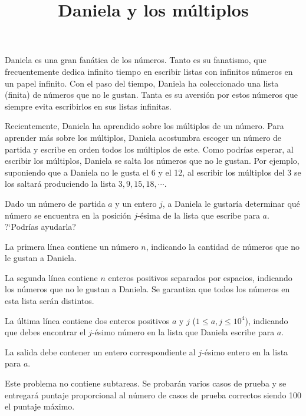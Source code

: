 \documentclass{oci}
\title{Daniela y los múltiplos}
\begin{document}
\begin{problemDescription}
Daniela es una gran fanática de los números.
Tanto es su fanatismo, que frecuentemente dedica infinito tiempo en
escribir listas con infinitos números en un papel infinito.
Con el paso del tiempo, Daniela ha coleccionado una lista (finita) de números que no
le gustan.
Tanta es su aversión por estos números que siempre evita escribirlos en sus
listas infinitas.

Recientemente, Daniela ha aprendido sobre los múltiplos de un número.
Para aprender más sobre los múltiplos, Daniela acostumbra escoger un número de partida y
escribe en orden todos los múltiplos de este.
Como podrías esperar, al escribir los múltiplos, Daniela se salta los números que no le gustan.
Por ejemplo, suponiendo que a Daniela no le gusta el 6 y el 12, al escribir los múltiplos
del 3 se los saltará produciendo la lista $3, 9, 15, 18, \cdots$.

Dado un número de partida $a$ y un entero $j$, a Daniela le gustaría determinar
qué número se encuentra en la posición $j$-ésima de la lista que escribe para $a$.
?`Podrías ayudarla?
\end{problemDescription}

\begin{inputDescription}
La primera línea contiene un número $n$, indicando la cantidad de números que no le gustan
a Daniela.

La segunda línea contiene $n$ enteros positivos separados por espacios,
indicando los números que no le gustan a Daniela.
Se garantiza que todos los números en esta lista serán distintos.

La última línea contiene dos enteros positivos $a$ y $j$ ($1 \leq a, j \leq 10^4$),
indicando que debes encontrar el $j$-ésimo número en la lista que Daniela
escribe para $a$.
\end{inputDescription}

\begin{outputDescription}
La salida debe contener un entero correspondiente al $j$-ésimo entero en la lista
para $a$.
\end{outputDescription}

\begin{scoreDescription}
Este problema no contiene subtareas.
Se probarán varios casos de prueba y se entregará puntaje proporcional al número
de casos de prueba correctos siendo 100 el puntaje máximo.
\end{scoreDescription}


\begin{sampleDescription}
\end{sampleDescription}
\end{document}
